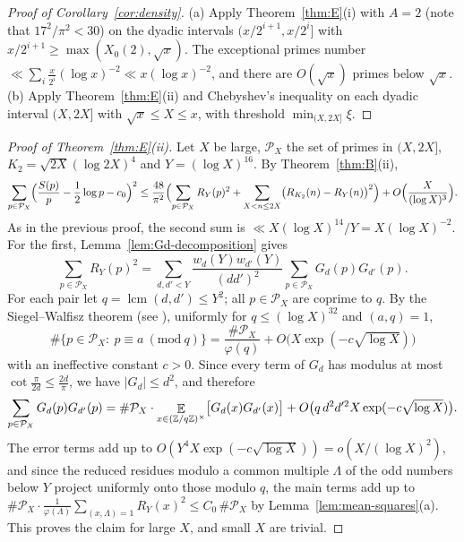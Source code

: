\begin{proof}[Proof of Corollary~\ref{cor:density}]
(a) Apply Theorem~\ref{thm:E}(i) with $A=2$ (note that $17^2/\pi^2<30$) on the dyadic intervals $(x/2^{i+1},x/2^i]$ with $x/2^{i+1}\ge\max(X_0(2),\sqrt x)$. The exceptional primes number $\ll\sum_i\frac{x}{2^i}(\log x)^{-2}\ll x(\log x)^{-2}$, and there are $O(\sqrt x)$ primes below $\sqrt x$. (b) Apply Theorem~\ref{thm:E}(ii) and Chebyshev's inequality on each dyadic interval $(X,2X]$ with $\sqrt x\le X\le x$, with threshold $\min_{(X,2X]}\xi$.
\end{proof}

\begin{proof}[Proof of Theorem~\textup{\ref{thm:E}(ii)}]
Let $X$ be large, $\mathcal P_X$ the set of primes in $(X,2X]$, $K_2=\sqrt{2X}(\log 2X)^4$ and $Y=(\log X)^{16}$. By Theorem~\ref{thm:B}(ii),
\[
\sum_{p\in\mathcal P_X}\Bigl(\frac{S(p)}{p}-\frac12\log p-c_0\Bigr)^2\le\frac{48}{\pi^2}\Bigl(\sum_{p\in\mathcal P_X}R_Y(p)^2+\sum_{X<n\le 2X}\bigl(R_{K_2}(n)-R_Y(n)\bigr)^2\Bigr)+O\Bigl(\frac{X}{(\log X)^3}\Bigr).
\]
As in the previous proof, the second sum is $\ll X(\log X)^{14}/Y=X(\log X)^{-2}$. For the first, Lemma~\ref{lem:Gd-decomposition} gives
\[
\sum_{p\in\mathcal P_X}R_Y(p)^2=\sum_{d,d'<Y}\frac{w_d(Y)w_{d'}(Y)}{(dd')^2}\sum_{p\in\mathcal P_X}G_d(p)G_{d'}(p).
\]
For each pair let $q=\operatorname{lcm}(d,d')\le Y^2$; all $p\in\mathcal P_X$ are coprime to $q$. By the Siegel--Walfisz theorem (see \cite{b15}), uniformly for $q\le(\log X)^{32}$ and $(a,q)=1$,
\[
\#\{p\in\mathcal P_X:\ p\equiv a\ (\mathrm{mod}\ q)\}=\frac{\#\mathcal P_X}{\varphi(q)}+O\bigl(X\exp(-c\sqrt{\log X})\bigr)
\]
with an ineffective constant $c>0$. Since every term of $G_d$ has modulus at most $\cot\frac{\pi}{2d}\le\frac{2d}{\pi}$, we have $|G_d|\le d^2$, and therefore
\[
\sum_{p\in\mathcal P_X}G_d(p)G_{d'}(p)=\#\mathcal P_X\cdot\mathop{\mathbb{E}}_{x\in(\mathbb{Z}/q\mathbb{Z})^\times}\bigl[G_d(x)G_{d'}(x)\bigr]+O\bigl(q\,d^2d'^2X\exp(-c\sqrt{\log X})\bigr).
\]
The error terms add up to $O(Y^4X\exp(-c\sqrt{\log X}))=o(X/(\log X)^2)$, and since the reduced residues modulo a common multiple $\Lambda$ of the odd numbers below $Y$ project uniformly onto those modulo $q$, the main terms add up to $\#\mathcal P_X\cdot\frac{1}{\varphi(\Lambda)}\sum_{(x,\Lambda)=1}R_Y(x)^2\le C_0\,\#\mathcal P_X$ by Lemma~\ref{lem:mean-squares}(a). This proves the claim for large $X$, and small $X$ are trivial.
\end{proof}

